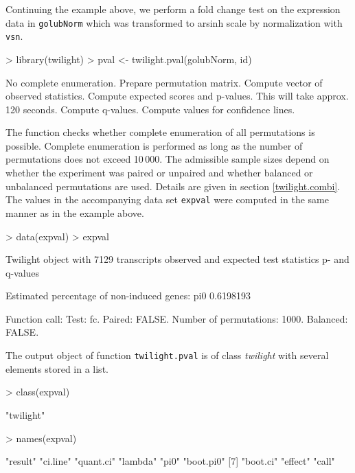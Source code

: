 \documentclass[11pt,a4paper,fleqn]{report}
\newcommand{\Robject}[1]{{\texttt{#1}}}
\newcommand{\Rfunction}[1]{{\texttt{#1}}}
\newcommand{\Rclass}[1]{{\textit{#1}}}
\begin{document}
Continuing the example above, we perform a fold change test on the expression data in \Robject{golubNorm} which was transformed to arsinh scale by normalization with \Rfunction{vsn}.
\begin{Schunk}
\begin{Sinput}
> library(twilight)
> pval <- twilight.pval(golubNorm, id)
\end{Sinput}
\begin{Soutput}
No complete enumeration. Prepare permutation matrix. 
Compute vector of observed statistics. 
Compute expected scores and p-values. This will take approx. 120 seconds. 
Compute q-values. 
Compute values for confidence lines. 
\end{Soutput}
\end{Schunk}
The function checks whether complete enumeration of all permutations is possible. Complete enumeration is performed as long as the number of permutations does not exceed 10\,000. The admissible sample sizes depend on whether the experiment was paired or unpaired and whether balanced or unbalanced permutations are used. Details are given in section \ref{twilight.combi}.
The values in the accompanying data set \Robject{expval} were computed in the same manner as in the example above.
\begin{Schunk}
\begin{Sinput}
> data(expval)
> expval
\end{Sinput}
\begin{Soutput}
 Twilight object with
     7129 transcripts
     observed and expected test statistics
     p- and q-values

 Estimated percentage of non-induced genes:
      pi0 
0.6198193 

 Function call:
 Test: fc. Paired: FALSE. Number of permutations: 1000. Balanced: FALSE. 
\end{Soutput}
\end{Schunk}
The output object of function \Rfunction{twilight.pval} is of class \Rclass{twilight} with several elements stored in a list.
\begin{Schunk}
\begin{Sinput}
> class(expval)
\end{Sinput}
\begin{Soutput}
[1] "twilight"
\end{Soutput}
\begin{Sinput}
> names(expval)
\end{Sinput}
\begin{Soutput}
[1] "result"   "ci.line"  "quant.ci" "lambda"   "pi0"      "boot.pi0"
[7] "boot.ci"  "effect"   "call"    
\end{Soutput}
\end{Schunk}
\end{document}
